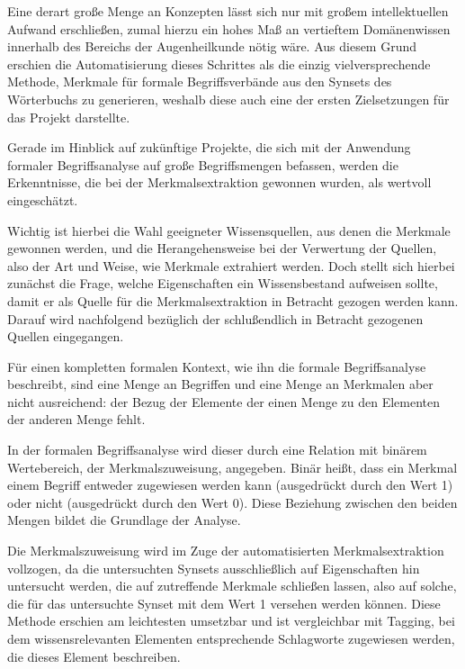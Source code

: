 \documentclass[pagesize,DIV=calc,12pt,draft]{scrreprt}
\begin{document}
Eine derart große Menge an Konzepten lässt sich nur mit großem
intellektuellen Aufwand erschließen, zumal hierzu ein hohes Maß an
vertieftem Domänenwissen innerhalb des Bereichs der Augenheilkunde nötig
wäre. Aus diesem Grund erschien die Automatisierung dieses Schrittes als
die einzig vielversprechende Methode, Merkmale für formale
Begriffsverbände aus den Synsets des Wörterbuchs zu generieren, weshalb
diese auch eine der ersten Zielsetzungen für das Projekt darstellte.

Gerade im Hinblick auf zukünftige Projekte, die sich mit der Anwendung
formaler Begriffsanalyse auf große Begriffsmengen befassen, werden die
Erkenntnisse, die bei der Merkmalsextraktion gewonnen wurden, als
wertvoll eingeschätzt.

Wichtig ist hierbei die Wahl geeigneter Wissensquellen, aus denen die
Merkmale gewonnen werden, und die Herangehensweise bei der Verwertung
der Quellen, also der Art und Weise, wie Merkmale extrahiert werden.
Doch stellt sich hierbei zunächst die Frage, welche Eigenschaften ein
Wissensbestand aufweisen sollte, damit er als Quelle für die
Merkmalsextraktion in Betracht gezogen werden kann. Darauf wird
nachfolgend bezüglich der schlußendlich in Betracht gezogenen Quellen
eingegangen.

Für einen kompletten formalen Kontext, wie ihn die formale
Begriffsanalyse beschreibt, sind eine Menge an Begriffen und eine Menge
an Merkmalen aber nicht ausreichend: der Bezug der Elemente der einen
Menge zu den Elementen der anderen Menge fehlt. 

In der formalen
Begriffsanalyse wird dieser durch eine Relation mit binärem
Wertebereich, der Merkmalszuweisung, angegeben. Binär heißt, dass ein
Merkmal einem Begriff entweder zugewiesen werden kann (ausgedrückt durch
den Wert 1) oder nicht (ausgedrückt durch den Wert 0). Diese
Beziehung zwischen den beiden Mengen bildet die Grundlage der Analyse.

Die Merkmalszuweisung wird im Zuge der automatisierten
Merkmalsextraktion vollzogen, da die untersuchten Synsets ausschließlich
auf Eigenschaften hin untersucht werden, die auf zutreffende Merkmale
schließen lassen, also auf solche, die für das untersuchte Synset mit
dem Wert 1 versehen werden können. Diese Methode erschien am leichtesten
umsetzbar und ist vergleichbar mit Tagging, bei dem wissensrelevanten
Elementen entsprechende Schlagworte zugewiesen werden, die dieses
Element beschreiben.
\end{document}
